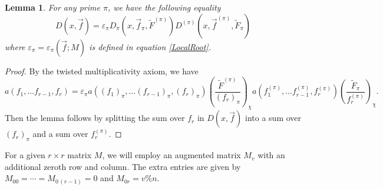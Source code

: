 \documentclass[11pt,letterpaper]{article}
\newtheorem{lemma}[theorem]{Lemma}
\theoremstyle{definition}
\theoremstyle{remark}
\numberwithin{equation}{section}
\theoremstyle{dotless}
\newcommand{\res}[2]{\left(\frac{#1}{#2}\right)}
\renewcommand{\tilde}{\widetilde}
\begin{document}
\begin{lemma} \label{LemmaDirichletFactorization}
For any prime $\pi$, we have the following equality
\begin{equation}
    D(x, \vec{f}) = \varepsilon_\pi D_{\pi}(x, \vec{f}_{\pi}, \tilde{F}^{(\pi)}) D^{(\pi)}(x, \vec{f}^{(\pi)}, \tilde{F}_{\pi})
\end{equation}
where $\varepsilon_\pi=\varepsilon_\pi(\vec{f}; M)$ is defined in equation \eqref{LocalRoot}.
\end{lemma}
\begin{proof}
By the twisted multiplicativity axiom, we have
\begin{equation*}
a(f_1, \ldots f_{r-1}, f_r) = \varepsilon_\pi a((f_1)_\pi,\ldots (f_{r-1})_\pi, (f_r)_\pi) \res{\tilde{F}^{(\pi)}}{(f_r)_{\pi}}_{\chi}  a(f_1^{(\pi)},\ldots f_{r-1}^{(\pi)}, f_r^{(\pi)}) \res{\tilde{F}_\pi}{f_r^{(\pi)}}_{\chi} .
\end{equation*}
Then the lemma follows by splitting the sum over $f_r$ in $D(x, \vec{f})$ into a sum over $(f_r)_\pi$ and a sum over $f_r^{(\pi)}$.
\end{proof}

For a given $r\times r$ matrix $M$, we will employ an augmented matrix $M_v$ with an additional zeroth row and column. The extra entries are given by $M_{00}=\cdots=M_{0\, (r-1)}=0$ and $M_{0r}=v \% n$.
\end{document}
